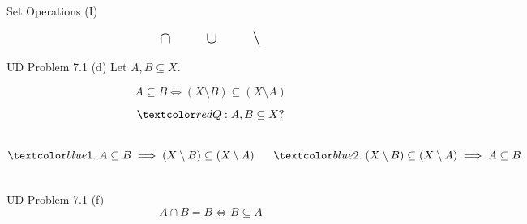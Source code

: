 
\begin{frame}{}
  \begin{center}
    {\Large Set Operations (I)}
  \end{center}

  \[
    \text{\Large $\cap \qquad \cup \qquad \setminus$}
  \]
\end{frame}

\begin{frame}
  \begin{exampleblock}{UD Problem 7.1 (d)}
    Let $A, B \subseteq X$.

    \[
      A \subseteq B \iff (X \setminus B) \subseteq (X \setminus A)
    \]
  \end{exampleblock}

  \pause
  \[
    \red{Q: A, B \subseteq X?}
  \]

  \pause
  \begin{columns}
      \[
	\blue{1.\; A \subseteq B \implies (X \setminus B) \subseteq (X \setminus A)}
      \]

      \[
	\blue{2.\; (X \setminus B) \subseteq (X \setminus A) \implies A \subseteq B}
      \]

  \end{columns}

\end{frame}

\begin{frame}
  \begin{exampleblock}{UD Problem 7.1 (f)}
    \[
      A \cap B = B \iff B \subseteq A
    \]
  \end{exampleblock}
\end{frame}

